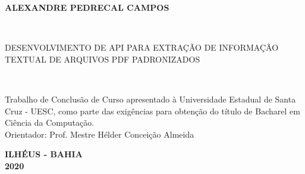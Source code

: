 
\begin{center}

    {\large \begin{large} \bfseries ALEXANDRE PEDRECAL CAMPOS \end{large}\\}
    \vspace{8cm}
    {\large\bfseries{\begin{large}DESENVOLVIMENTO DE API PARA EXTRAÇÃO DE INFORMAÇÃO TEXTUAL DE ARQUIVOS PDF PADRONIZADOS\end{large}}\\}
    \vspace{1cm}
    \hspace{.45\linewidth}
    \begin{minipage}{.50\linewidth}
            Trabalho de Conclusão de Curso apresentado à Universidade Estadual de Santa Cruz - UESC, como parte das exigências para obtenção do título de Bacharel em Ciência da Computação.
            \\ Orientador: Prof. Mestre Hélder Conceição Almeida


    \end{minipage}

    \vspace{2cm}
    \vfill
    {\large\bfseries{ ILHÉUS - BAHIA \\ 2020}}
\end{center}

